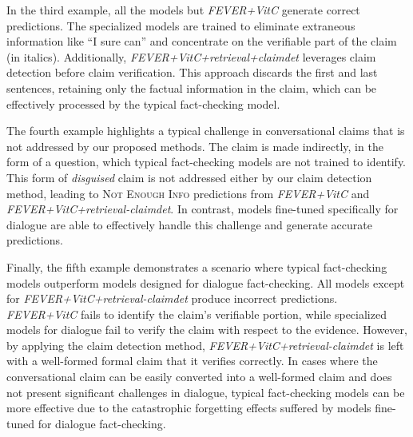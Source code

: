 In the third example, all the models but \textit{FEVER+VitC} generate correct predictions. The specialized models are trained to eliminate extraneous information like ``I sure can'' and concentrate on the verifiable part of the claim (in italics). Additionally, \textit{FEVER+VitC+retrieval+claimdet} leverages claim detection before claim verification. This approach discards the first and last sentences, retaining only the factual information in the claim, which can be effectively processed by the typical fact-checking model.

The fourth example highlights a typical challenge in conversational claims that is not addressed by our proposed methods. The claim is made indirectly, in the form of a question, which typical fact-checking models are not trained to identify. This form of \textit{disguised} claim is not addressed either by our claim detection method, leading to \textsc{Not Enough Info} predictions from \textit{FEVER+VitC} and \textit{FEVER+VitC+retrieval-claimdet}. In contrast, models fine-tuned specifically for dialogue are able to effectively handle this challenge and generate accurate predictions.

Finally, the fifth example demonstrates a scenario where typical fact-checking models outperform models designed for dialogue fact-checking. All models except for \textit{FEVER+VitC+retrieval-claimdet} produce incorrect predictions. \textit{FEVER+VitC} fails to identify the claim's verifiable portion, while specialized models for dialogue fail to verify the claim with respect to the evidence. However, by applying the claim detection method, \textit{FEVER+VitC+retrieval-claimdet} is left with a well-formed formal claim that it verifies correctly. In cases where the conversational claim can be easily converted into a well-formed claim and does not present significant challenges in dialogue, typical fact-checking models can be more effective due to the catastrophic forgetting effects suffered by models fine-tuned for dialogue fact-checking.


